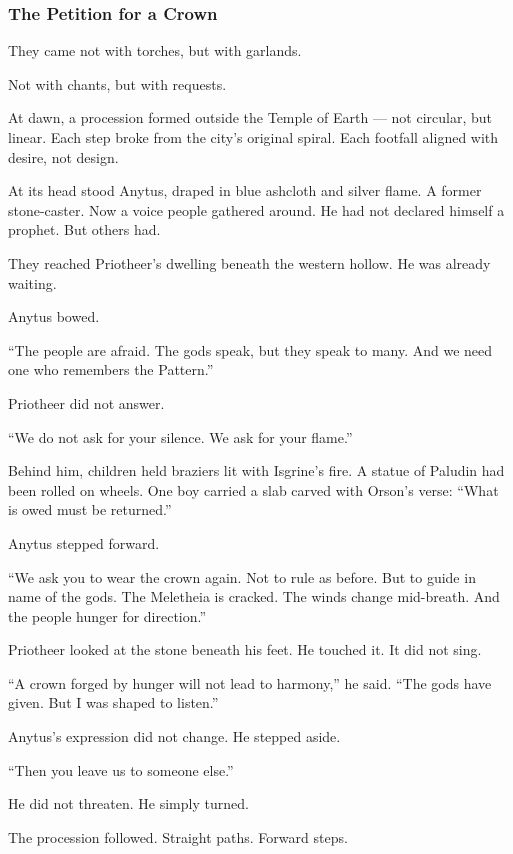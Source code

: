\documentclass[12pt]{article}
\begin{document}
\vspace{.5in}

\subsubsection{The Petition for a Crown}

They came not with torches, but with garlands.

Not with chants, but with requests.

At dawn, a procession formed outside the Temple of Earth —  
not circular, but linear.  
Each step broke from the city's original spiral.  
Each footfall aligned with desire, not design.

At its head stood Anytus, draped in blue ashcloth and silver flame.  
A former stone-caster. Now a voice people gathered around.  
He had not declared himself a prophet.  
But others had.

They reached Priotheer's dwelling beneath the western hollow.  
He was already waiting.

Anytus bowed.

 “The people are afraid.  
 The gods speak, but they speak to many.  
 And we need one who remembers the Pattern.”

Priotheer did not answer.

 “We do not ask for your silence.  
 We ask for your flame.”

Behind him, children held braziers lit with Isgrine’s fire.  
A statue of Paludin had been rolled on wheels.  
One boy carried a slab carved with Orson’s verse:  
 “What is owed must be returned.”

Anytus stepped forward.

 “We ask you to wear the crown again.  
 Not to rule as before.  
 But to guide in name of the gods.  
 The Meletheia is cracked.  
 The winds change mid-breath.  
 And the people hunger for direction.”

Priotheer looked at the stone beneath his feet.  
He touched it.  
It did not sing.

 “A crown forged by hunger will not lead to harmony,” he said.  
 “The gods have given.  
 But I was shaped to listen.”

Anytus’s expression did not change.  
He stepped aside.

 “Then you leave us to someone else.”

He did not threaten.  
He simply turned.

The procession followed.  
Straight paths. Forward steps.
\end{document}
